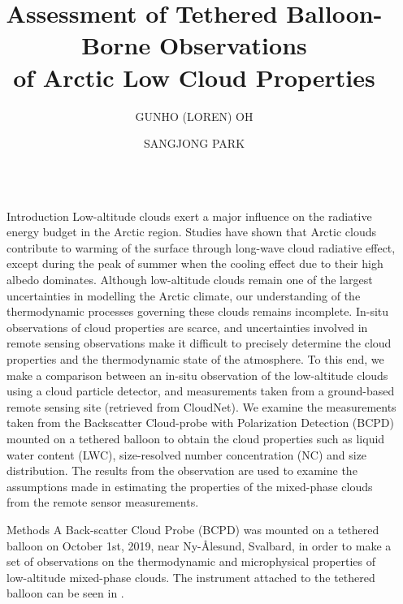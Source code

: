 \documentclass[final]{beamer}
\title{Assessment of Tethered Balloon-Borne Observations \\ of Arctic Low Cloud Properties}
\author{GUNHO (LOREN) OH \inst{1} \and SANGJONG PARK \inst{1}}
\institute[shortinst]{\inst{1} Korea Polar Research Institute (KOPRI)}
\newlength{\sepwidth}
\newlength{\colwidth}
\newcommand{\separatorcolumn}{\begin{column}{\sepwidth}\end{column}}
\begin{document}
\begin{frame}[t]
  \begin{columns}[t]

    \separatorcolumn
    \begin{column}{\colwidth}

      \begin{block}{Introduction}
        Low-altitude clouds exert a major influence on the radiative energy budget in the Arctic region. Studies have shown that Arctic clouds contribute to warming of the surface through long-wave cloud radiative effect, except during the peak of summer when the cooling effect due to their high albedo dominates. Although low-altitude clouds remain one of the largest uncertainties in modelling the Arctic climate, our understanding of the thermodynamic processes governing these clouds remains incomplete. In-situ observations of cloud properties are scarce, and uncertainties involved in remote sensing observations make it difficult to precisely determine the cloud properties and the thermodynamic state of the atmosphere. To this end, we make a comparison between an in-situ observation of the low-altitude clouds using a cloud particle detector, and measurements taken from a ground-based remote sensing site (retrieved from CloudNet). We examine the measurements taken from the Backscatter Cloud-probe with Polarization Detection (BCPD) mounted on a tethered balloon to obtain the cloud properties such as liquid water content (LWC), size-resolved number concentration (NC) and size distribution. The results from the  observation are used to examine the assumptions made in estimating the properties of the mixed-phase clouds from the remote sensor measurements.
      \end{block}

      \begin{block}{Methods}
        A Back-scatter Cloud Probe (BCPD) \cite{baumgardner2014ice, thomson2014compact} was mounted on a tethered balloon on October 1st, 2019, near Ny-\r{A}lesund, Svalbard, in order to make a set of observations on the thermodynamic and microphysical properties of low-altitude mixed-phase clouds. The instrument attached to the tethered balloon can be seen in .


\end{block}
\end{column}
\end{columns}
\end{frame}
\end{document}
